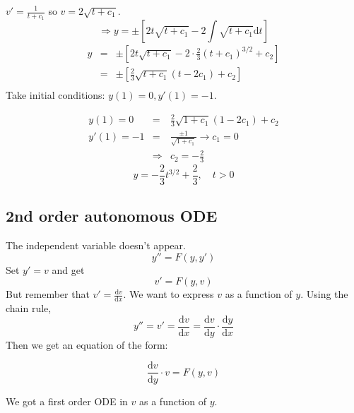 \documentclass{article}
\newcommand{\mathd}{\mathrm{d}}
\newenvironment{enumeratenumeric}{\begin{enumerate}[1.] }{\end{enumerate}}
\newenvironment{enumerateromancap}{\begin{enumerate}[I.] }{\end{enumerate}}
\begin{document}
\begin{enumeratenumeric}
\begin{enumerateromancap}
    $v' = \frac{1}{t + c_1}$ so $v = 2 \sqrt{t + c_1}$.
    \[ \Rightarrow y = \pm \left[ 2 t \sqrt{t + c_1} - 2 \int \sqrt{t + c_1}
       \mathd t \right] \]
    \begin{eqnarray*}
      y & = & \pm \left[ 2 t \sqrt{t + c_1} - 2 \cdot \frac{2}{3} (t + c_1)^{3
      / 2} + c_2 \right]\\
      & = & \pm \left[ \frac{2}{3}  \sqrt{t + c_1}  (t - 2 c_1) + c_2
      \right]\\
      &  & 
    \end{eqnarray*}
    Take initial conditions: $y (1) = 0, y' (1) = - 1$.
  \end{enumerateromancap}
  \begin{eqnarray*}
    y (1) = 0 & = & \frac{2}{3}  \sqrt{1 + c_1}  (1 - 2 c_1) + c_2\\
    y' (1) = - 1 & = & \frac{\pm 1}{\sqrt{1 + c_1}} \rightarrow c_1 = 0\\
    & \Rightarrow & c_2 = - \frac{2}{3}
  \end{eqnarray*}
  \[ y = - \frac{2}{3} t^{3 / 2} + \frac{2}{3}, \quad t > 0 \]
\end{enumeratenumeric}

\subsection{2nd order autonomous ODE}

The independent variable doesn't appear.
\[ y'' = F (y, y') \]
Set $y' = v$ and get
\[ v' = F (y, v) \]
But remember that $v' = \frac{\mathd v}{\mathd x}$. We want to express $v$ as
a function of $y$. Using the chain rule,
\[ y'' = v' = \frac{\mathd v}{\mathd x} = \frac{\mathd v}{\mathd y} \cdot
   \frac{\mathd y}{\mathd x} \]
Then we get an equation of the form:

\begin{tmornamented}
  \[ \frac{\mathd v}{\mathd y} \cdot v = F (y, v) \]
\end{tmornamented}

We got a first order ODE in $v$ as a function of $y$.
\end{document}
